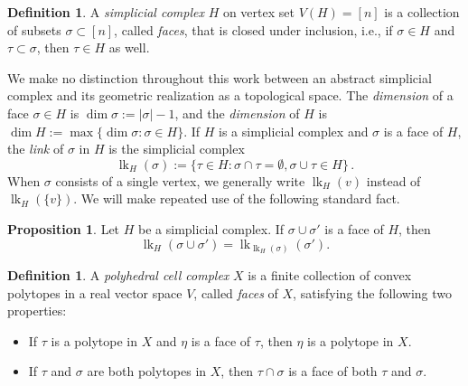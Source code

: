 \documentclass[11pt]{amsart}
\theoremstyle{definition}
\newtheorem{definition}[theorem]{Definition}
\newtheorem{proposition}[theorem]{Proposition}
\numberwithin{equation}{section}
\theoremstyle{remark}
\numberwithin{equation}{section}
\begin{document}
\begin{definition}
A \emph{simplicial complex} $H$ on vertex set $V(H) = [n]$ is a collection of subsets $\sigma \subset [n]$, called \emph{faces}, that is closed under inclusion, i.e., if $\sigma \in H$ and $\tau \subset \sigma$, then $\tau \in H$ as well. 
\end{definition}

We make no distinction throughout this work between an abstract simplicial complex and its geometric realization as a topological space.
The \emph{dimension} of a face $\sigma \in H$ is $\dim \sigma:= |\sigma|-1$, and the \emph{dimension} of $H$ is $\dim H:=\max\{\dim \sigma: \sigma \in H\}$.  
If $H$ is a simplicial complex and $\sigma$ is a face of $H$, the \emph{link} of $\sigma$ in $H$ is the simplicial complex 
\[\operatorname{lk}_{H}(\sigma):=\{\tau \in H: \sigma \cap \tau = \emptyset, \sigma \cup \tau \in H\} \, .\]
When $\sigma$ consists of a single vertex, we generally write $\operatorname{lk}_{H}(v)$ instead of $\operatorname{lk}_{H}(\{v\})$.
We will make repeated use of the following standard fact.

\begin{proposition} \label{link-property}
Let $H$ be a simplicial complex.  If $\sigma \cup \sigma'$ is a face of $H$, then $$\operatorname{lk}_H(\sigma \cup \sigma') = \operatorname{lk}_{\operatorname{lk}_H(\sigma)}(\sigma').$$
\end{proposition}

\begin{definition}
A \emph{polyhedral cell complex} $X$ is a finite collection of convex polytopes in a real vector space $V$, called \emph{faces} of $X$, satisfying the following two properties:
\begin{itemize}
\item If $\tau$ is a polytope in $X$ and $\eta$ is a face of $\tau$, then $\eta$ is a polytope in $X$.
\item If $\tau$ and $\sigma$ are both polytopes in $X$, then $\tau\cap \sigma$ is a face of both $\tau$ and $\sigma$.
\end{itemize}
\end{definition}
\end{document}
